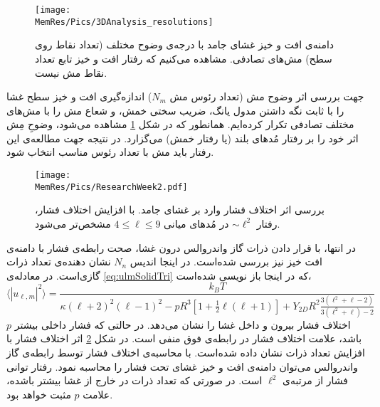\begin{figure}[htbp]
\begin{center}
\texttt{[image: \\MemRes/Pics/3DAnalysis\_resolutions]}
\caption{
دامنه‌ی افت و خیز غشای جامد با درجه‌ی وضوح مختلف (تعداد نقاط روی  سطح) مش‌های تصادفی. مشاهده می‌کنیم که رفتار افت و خیز تابع تعداد نقاط مش نیست. 
}
\label{fig:3DAnalysis_resolutions}
\end{center}
\end{figure}

جهت بررسی اثر وضوح مش (تعداد رئوس مش 
$N_m$)
 اندازه‌گیری افت و خیز سطح غشا را با ثابت نگه داشتن مدول یانگ، ضریب سختی خمش، و شعاع مش را با مش‌های مختلف تصادفی تکرار کرده‌ایم. همانطور که در شکل
\ref{fig:3DAnalysis_resolutions}
مشاهده می‌شود، وضوحِ مِش اثر خود را بر رفتار مُد‌های بلند (یا رفتار خمش)  می‌گزارد. در نتیجه جهت مطالعه‌ی این رفتار باید مش با تعداد رئوس مناسب انتخاب شود. 

\begin{figure}[htbp]
\begin{center}
\texttt{[image: \\MemRes/Pics/ResearchWeek2.pdf]}
\caption{
بررسی اثر اختلاف فشار وارد بر غشای جامد. با افزایش اختلاف فشار، رفتار 
$\sim\ell^2$
در مُد‌های میانی 
$4\leq\ell\leq9$
مشخص‌تر می‌شود.
}
\label{fig:presure}
\end{center}
\end{figure}

در انتها، با قرار دادن ذرات گاز واندروالس درون غشا، صحت رابطه‌ی فشار با دامنه‌ی افت خیز نیز بررسی شده‌است. در اینجا اندیس 
$N_n$
نشان دهنده‌ی تعداد ذرات گازی‌است. در معادله‌ی 
\ref{eq:ulmSolidTri}
که در اینجا باز نویسی شده‌است،
\begin{equation}
\langle|u_{\ell,m}|^2\rangle=\frac{k_BT}{\kappa(\ell+2)^2(\ell-1)^2-pR^3\left[1+\frac{1}{2}\ell(\ell+1)\right]+Y_{2D}R^2\frac{3(\ell^2+\ell-2)}{3(\ell^2+\ell)-2}}
\end{equation}
$p$
اختلاف فشار بیرون و داخل غشا را نشان می‌دهد. در حالتی که فشار داخلی بیشتر باشد، علامت اختلاف فشار در رابطه‌ی فوق منفی‌ است. در شکل 
\ref{fig:presure}
اثر اختلاف فشار با افزایش تعداد ذرات نشان دا‌ده‌ شده‌است. با محاسبه‌ی اختلاف فشار توسط رابطه‌ی گاز واندروالس می‌توان دامنه‌ی افت و خیز غشای تحت فشار را محاسبه نمود. رفتار توانی فشار از مرتبه‌ی 
$\ell^2$
است. در صورتی که تعداد ذرات در خارج از غشا بیشتر باشده، علامت 
$p$
مثبت خواهد بود.





